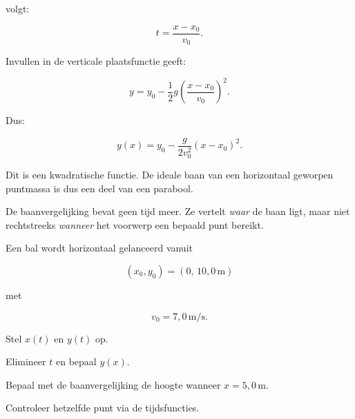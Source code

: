 \documentclass{ximera}
\begin{document}
volgt:

\[
t=\frac{x-x_0}{v_0}.
\]

Invullen in de verticale plaatsfunctie geeft:

\[
y
=
y_0
-
\frac12g
\left(
\frac{x-x_0}{v_0}
\right)^2.
\]

Dus:

\[
\boxed{
y(x)
=
y_0
-
\frac{g}{2v_0^2}(x-x_0)^2.
}
\]

Dit is een kwadratische functie. De ideale baan van een horizontaal
geworpen puntmassa is dus een deel van een parabool.


\begin{opmerking}

De baanvergelijking bevat geen tijd meer. Ze vertelt \emph{waar} de
baan ligt, maar niet rechtstreeks \emph{wanneer} het voorwerp een
bepaald punt bereikt.

\end{opmerking}


\begin{oefening}{\oefU\ESS}

Een bal wordt horizontaal gelanceerd vanuit

\[
(x_0,y_0)=(0,\,10,0\,\mathrm{m})
\]

met

\[
v_0=7,0\,\mathrm{m/s}.
\]

\begin{question}
Stel $x(t)$ en $y(t)$ op.
\end{question}

\begin{question}
Elimineer $t$ en bepaal $y(x)$.
\end{question}

\begin{question}
Bepaal met de baanvergelijking de hoogte wanneer $x=5,0\,\mathrm{m}$.
\end{question}

\begin{question}
Controleer hetzelfde punt via de tijdsfuncties.
\end{question}

\end{oefening}
\end{document}
